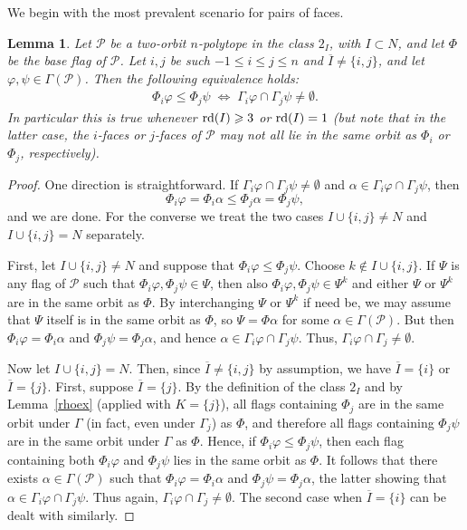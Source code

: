 \documentclass[12pt]{article}
\renewcommand{\phi}{\varphi}
\renewcommand{\bar}{\overline}
\renewcommand{\>}{\rangle}
\renewcommand{\leq}{\leqslant}
\renewcommand{\geq}{\geqslant}
\newtheorem{lemma}[theorem]{Lemma}
\theoremstyle{definition}\newtheorem{definition}{Definition}[section]
\begin{document}
We begin with the most prevalent scenario for pairs of faces.

\begin{lemma}
\label{char1}
Let $\mathcal{P}$ be a two-orbit $n$-polytope in the class $2_I$, with $I \subset N$, and let $\Phi$ be the base flag of $\mathcal{P}$. Let $i,j$ be such $-1 \leq i \leq j \leq n$ and $\bar{I}\neq \{i,j\}$, and let $\phi, \psi \in \Gamma(\mathcal{P})$. Then the following equivalence holds:
\begin{eqnarray}
\label{equivnminus3}
\Phi_i\phi \leq\Phi_j\psi \;\Longleftrightarrow\; \Gamma_i\phi \cap \Gamma_j \psi \neq \emptyset. 
\end{eqnarray}
In particular this is true whenever ${\rm rd}(I)\geq 3$ or ${\rm rd}(I)=1$ (but note that in the latter case, the $i$-faces or $j$-faces of $\mathcal{P}$ may not all lie in the same orbit as $\Phi_i$ or $\Phi_j$, respectively).
\end{lemma}

\begin{proof}
One direction is straightforward. If $\Gamma_i\phi\cap\Gamma_j\psi\neq\emptyset$ and $\alpha\in\Gamma_i\phi\cap \Gamma_j\psi$, then
\[ \Phi_{i}\varphi=\Phi_{i}\alpha\leq\Phi_{j}\alpha=\Phi_{j}\psi,\]
and we are done. For the converse we treat the two cases $I \cup \{i,j\} \neq N$ and $I \cup \{i,j\} =N$ separately.

First, let $I\cup\{i,j\}\neq N$ and suppose that $\Phi_i\phi\leq\Phi_j\psi$. Choose $k\notin I\cup\{i,j\}$. If $\Psi$ is any flag of $\mathcal{P}$ such that $\Phi_i\phi, \Phi_j\psi \in \Psi$, then also $\Phi_i\phi, \Phi_j\psi \in \Psi^k$ and either $\Psi$ or $\Psi^k$ are in the same orbit as $\Phi$. By interchanging $\Psi$ or $\Psi^k$ if need be, we may assume that $\Psi$ itself is in the same orbit as $\Phi$, so $\Psi=\Phi\alpha$ for some $\alpha \in \Gamma(\mathcal{P})$. But then $\Phi_i\phi =  \Phi_i\alpha$ and $\Phi_j\psi=\Phi_j\alpha$, and hence $\alpha \in \Gamma_i\phi \cap \Gamma_j \psi$. Thus, $\Gamma_i\phi \cap \Gamma_j\neq\emptyset$.

Now let $I\cup\{i,j\}=N$. Then, since $\bar{I}\neq\{i,j\}$ by assumption, we have $\bar{I}=\{i\}$ or $\bar{I}=\{j\}$. First, suppose $\bar{I}=\{j\}$. By the definition of the class $2_I$ and by Lemma~\ref{rhoex} (applied with $K=\{j\}$), all flags containing $\Phi_j$ are in the same orbit under $\Gamma$ (in fact, even under $\Gamma_j$) as $\Phi$, and therefore all flags containing $\Phi_j\psi$ are in the same orbit under $\Gamma$ as $\Phi$. Hence, if $\Phi_i\phi \leq \Phi_j\psi$, then each flag containing both $\Phi_i\phi$ and $\Phi_j\psi$ lies  in the same orbit as $\Phi$. It follows that there exists $\alpha \in \Gamma(\mathcal{P})$ such that $\Phi_i\phi =  \Phi_i\alpha$ and $\Phi_j\psi=\Phi_j\alpha$, the latter showing that  $\alpha\in\Gamma_i\phi\cap\Gamma_j\psi$. Thus again, $\Gamma_i\phi \cap \Gamma_j\neq\emptyset$. The second case when $\bar{I}=\{i\}$ can be dealt with similarly. 
\end{proof}
\end{document}
